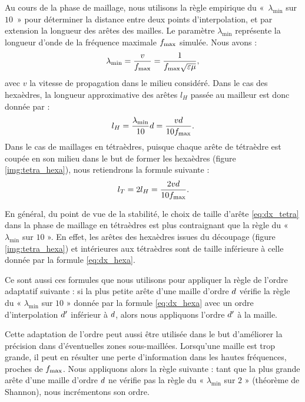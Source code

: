 Au cours de la phase de maillage, nous utilisons la règle empirique
du «~$\lambda_{\min}$ sur $10$~» pour déterminer la distance 
entre deux points d'interpolation, et par extension la longueur des arêtes des mailles.
Le paramètre $\lambda_{\min}$ représente la longueur d'onde
de la fréquence maximale $f_{\max}$ simulée. Nous avons :
\begin{align}
	\lambda_{\min} = \frac{v}{f_{\max}}
	=  \frac{1}{f_{\max} \sqrt{\varepsilon \mu}} ,
\end{align}
avec $v$ la vitesse de propagation dans le milieu considéré.
Dans le cas des hexaèdres, la longueur approximative
des arêtes $l_H$ passée au mailleur est donc donnée par :
\begin{align}
	l_H = \frac{\lambda_{\min}}{10} d
	= \frac{v d}{10 f_{\max}}
	\label{eq:dx_hexa} .
\end{align}
Dans le cas de maillages en tétraèdres, puisque chaque arête de tétraèdre
est coupée en son milieu dans le but de former les hexaèdres (figure \ref{img:tetra_hexa}),
nous retiendrons la formule suivante :
\begin{align}
	l_T = 2 l_H = \frac{2 v d}{10 f_{\max}}
	\label{eq:dx_tetra} .
\end{align}

\begin{remark}
	En général, du point de vue de la stabilité, le choix de taille
	d'arête \eqref{eq:dx_tetra} dans la phase de maillage
	en tétraèdres est plus contraignant que la règle du
	« $\lambda_{\min}$ sur $10$ ».
	En effet, les arêtes des hexaèdres issues du découpage (figure \ref{img:tetra_hexa}) et
	intérieures aux tétraèdres sont de taille
	inférieure à celle donnée par la formule \eqref{eq:dx_hexa}.
\end{remark}

Ce sont aussi ces formules que nous utilisons pour appliquer la règle
de l'ordre adaptatif suivante : si la plus petite arête d'une maille
d'ordre $d$ vérifie la
règle du « $\lambda_{\min}$ sur $10$ » donnée par la
formule \eqref{eq:dx_hexa} avec un ordre d'interpolation $d'$ inférieur
à $d$, alors nous appliquons l'ordre $d'$ à la maille.

Cette adaptation de l'ordre peut aussi être utilisée dans le but
d'améliorer la précision dans d'éventuelles zones sous-maillées.
Lorsqu'une maille est trop grande, il peut en résulter
une perte d'information dans les hautes fréquences, proches de
$f_{\max}$. Nous appliquons alors la règle suivante :
tant que la plus grande arête d'une maille d'ordre $d$ ne vérifie pas la
règle du « $\lambda_{\min}$ sur $2$ » (théorème de Shannon),
nous incrémentons son ordre.

